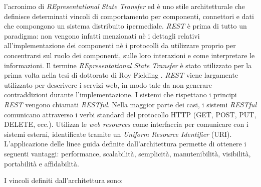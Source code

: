 \upe l'acronimo di \emph{REpresentational State Transfer} ed è uno stile architetturale che definisce determinati vincoli di comportamento per componenti, connettori e dati che compongono un sistema distribuito ipermediale. \emph{REST} è prima di tutto un paradigma: non vengono infatti menzionati nè i dettagli relativi all'implementazione dei componenti nè i protocolli da utilizzare proprio per concentrarsi sul ruolo dei componenti, sulle loro interazioni e come interpretare le informazioni. Il termine \emph{REpresentational State Transfer} è stato utilizzato per la prima volta nella tesi di dottorato di Roy Fielding \cite{fielding2000architectural}. \emph{REST} viene largamente utilizzato per descrivere i servizi web, in modo tale da non generare contraddizioni durante l'implementazione. I sistemi che rispettano i principi \emph{REST} vengono chiamati \emph{RESTful}. Nella maggior parte dei casi, i sistemi \emph{RESTful} comunicano attraverso i verbi standard del protocollo HTTP (GET, POST, PUT, DELETE, ecc.). Utilizza le \emph{web resources} come interfaccia per comunicare con i sistemi esterni, identificate tramite un \emph{Uniform Resource Identifier} (URI). L'applicazione delle linee guida definite dall'architettura permette di ottenere i seguenti vantaggi: performance, scalabilità, semplicità, manutenibilità, visibilità, portabilità e affidabilità.

I vincoli definiti dall'architettura sono:

